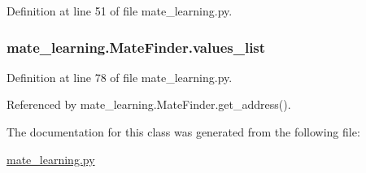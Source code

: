 Definition at line 51 of file mate\+\_\+learning.\+py.

\hypertarget{classmate__learning_1_1_mate_finder_a72604851fbd5d9d64ef8f21ab3bbb08b}{
\subsubsection[{values\+\_\+list}]{\setlength{\rightskip}{0pt plus 5cm}mate\+\_\+learning.\+Mate\+Finder.\+values\+\_\+list}}\label{classmate__learning_1_1_mate_finder_a72604851fbd5d9d64ef8f21ab3bbb08b}


Definition at line 78 of file mate\+\_\+learning.\+py.



Referenced by mate\+\_\+learning.\+Mate\+Finder.\+get\+\_\+address().



The documentation for this class was generated from the following file\+:\begin{DoxyCompactItemize}
\item 
\hyperlink{mate__learning_8py}{mate\+\_\+learning.\+py}\end{DoxyCompactItemize}
